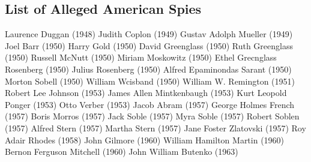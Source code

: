 \documentclass{memoir}
\begin{document}
\begin{refsegment}
\subsection{List of Alleged American Spies}
\begin{multicols}{2}
\setlength{\parindent}{0ex}
Laurence Duggan (1948)\newline
Judith Coplon (1949)\newline
Gustav Adolph Mueller (1949)\newline
Joel Barr (1950)\newline
Harry Gold (1950)\newline
David Greenglass (1950)\newline
Ruth Greenglass (1950)\newline
Russell McNutt (1950)\newline
Miriam Moskowitz (1950)\newline
Ethel Grecnglass Rosenberg (1950)\newline
Julius Rosenberg (1950)\newline
Alfred Epaminondas Sarant (1950)\newline
Morton Sobell (1950)\newline
William Wcisband (1950)\newline
William W. Remington (1951)\newline
Robert Lee Johnson (1953)\newline
James Allen Mintkenbaugh (1953)\newline
Kurt Leopold Ponger (1953)\newline
Otto Verber (1953)\newline
Jacob Abram (1957)\newline
George Holmes French (1957)\newline
Boris Morros (1957)\newline
Jack Soble (1957)\newline
Myra Soble (1957)\newline
Robert Soblen (1957)\newline
Alfred Stern (1957)\newline
Martha Stern (1957)\newline
Jane Foster Zlatovski (1957)\newline
Roy Adair Rhodes (1958)\newline
John Gilmore (1960)\newline
William Hamilton Martin (1960)\newline
Bernon Ferguson Mitchell (1960)\newline
John William Butenko (1963)\newline

\end{multicols}
\end{refsegment}
\end{document}
